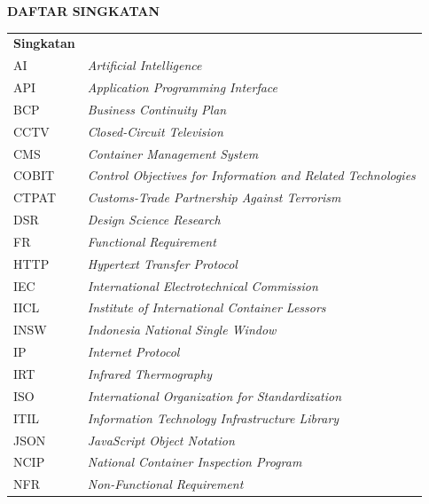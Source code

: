 \cleardoublepage
\vspace{2cm}
\begin{center}
{\fontsize{14}{16.8}\selectfont\textbf{DAFTAR SINGKATAN}}\\[1em]
\end{center}
\label{chap:singkatan}
\setcounter{chapter}{0}
\setcounter{section}{0}
\vspace{2em}

\begingroup
\small
\setlength{\tabcolsep}{3pt}
\renewcommand{\arraystretch}{0.95}
\begin{longtable}{@{} l >{\raggedright\arraybackslash}p{11cm} @{}}
\multicolumn{1}{l}{\textbf{Singkatan}} & \multicolumn{1}{l}{\textbf{Deskripsi}} \\

AI & \textit{Artificial Intelligence} \\
API & \textit{Application Programming Interface} \\
BCP & \textit{Business Continuity Plan} \\
CCTV & \textit{Closed-Circuit Television} \\
CMS & \textit{Container Management System} \\
COBIT & \textit{Control Objectives for Information and Related Technologies} \\
CTPAT & \textit{Customs-Trade Partnership Against Terrorism} \\
DSR & \textit{Design Science Research} \\
FR & \textit{Functional Requirement} \\
HTTP & \textit{Hypertext Transfer Protocol} \\
IEC & \textit{International Electrotechnical Commission} \\
IICL & \textit{Institute of International Container Lessors} \\
INSW & \textit{Indonesia National Single Window} \\
IP & \textit{Internet Protocol} \\
IRT & \textit{Infrared Thermography} \\
ISO & \textit{International Organization for Standardization} \\
ITIL & \textit{Information Technology Infrastructure Library} \\
JSON & \textit{JavaScript Object Notation} \\
NCIP & \textit{National Container Inspection Program} \\
NFR & \textit{Non-Functional Requirement} \\

\end{longtable}
